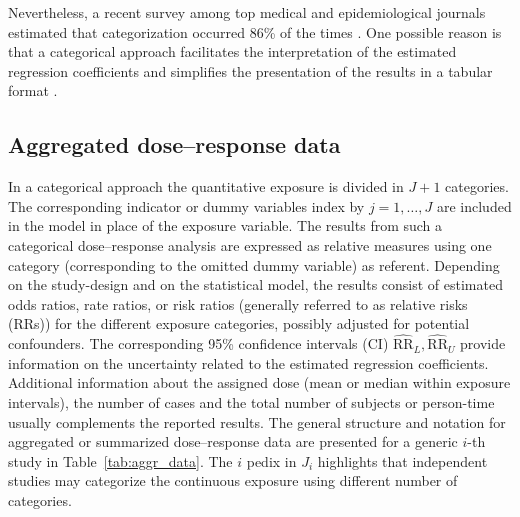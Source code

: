 \documentclass[11pt,a4paper,twoside,openany]{book}\usepackage{knitr}
\begin{document}
{Nevertheless, a recent survey among top medical and epidemiological journals estimated that categorization occurred 86\% of the times \citep{turner2010categorisation}. One possible reason is that a categorical approach facilitates the interpretation of the estimated regression coefficients and simplifies the presentation of the results in a tabular format \citep{orsini2011procedure}. 


\subsection{Aggregated dose--response data}

In a categorical approach the quantitative exposure is divided in $J+1$ categories. The corresponding indicator or dummy variables index by $j = 1, \dots, J$ are included in the model in place of the exposure variable. The results from such a categorical dose--response analysis are expressed as relative measures using one category (corresponding to the omitted dummy variable) as referent. Depending on the study-design and on the statistical model, the results consist of estimated odds ratios, rate ratios, or risk ratios (generally referred to as relative risks (RRs)) for the different exposure categories, possibly adjusted for potential confounders. The corresponding 95\% confidence intervals (CI) $\widehat{\mathrm{RR}}_L, \widehat{\mathrm{RR}}_U$ provide information on the uncertainty related to the estimated regression coefficients. Additional information about the assigned dose (mean or median within exposure intervals), the number of cases and the total number of subjects or person-time usually complements the reported results. The general structure and notation for aggregated or summarized dose--response data are presented for a generic $i$-th study in Table~\ref{tab:aggr_data}. The $i$ pedix in $J_i$ highlights that independent studies may categorize the continuous exposure using different number of categories.

}
\end{document}
